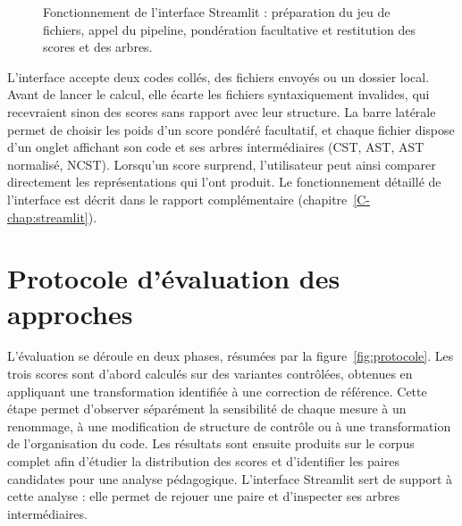 \documentclass[12pt,a4paper,oneside]{report}
\begin{document}
\begin{figure}[htbp]
{%
}
\caption{Fonctionnement de l'interface Streamlit : préparation du jeu de
fichiers, appel du pipeline, pondération facultative et restitution des
scores et des arbres.}
\label{fig:streamlit}
\end{figure}


L'interface accepte deux codes collés, des fichiers envoyés ou un dossier
local. Avant de lancer le calcul, elle écarte les fichiers syntaxiquement
invalides, qui recevraient sinon des scores sans rapport avec leur
structure. La barre latérale permet de choisir les poids d'un score pondéré
facultatif, et chaque fichier dispose d'un onglet affichant son code et ses
arbres intermédiaires (CST, AST, AST normalisé, NCST). Lorsqu'un score
surprend, l'utilisateur peut ainsi comparer directement les représentations
qui l'ont produit. Le fonctionnement détaillé de l'interface est décrit dans
le rapport complémentaire (chapitre~\ref{C-chap:streamlit}).


\section{Protocole d'évaluation des approches}

L'évaluation se déroule en deux phases, résumées par la
figure~\ref{fig:protocole}. Les trois scores sont d'abord calculés sur des
variantes contrôlées, obtenues en appliquant une transformation identifiée à
une correction de référence. Cette étape permet d'observer séparément la
sensibilité de chaque mesure à un renommage, à une modification de structure
de contrôle ou à une transformation de l'organisation du code. Les résultats
sont ensuite produits sur le corpus complet afin d'étudier la distribution des
scores et d'identifier les paires candidates pour une analyse pédagogique.
L'interface Streamlit sert de support à cette analyse : elle permet de
rejouer une paire et d'inspecter ses arbres intermédiaires.
\end{document}
